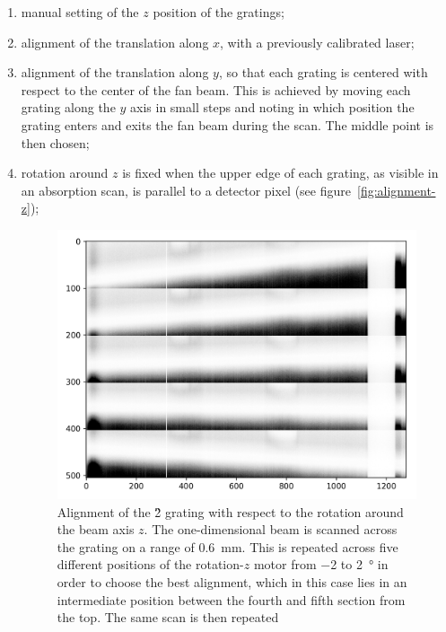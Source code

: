 \begin{enumerate}
    \item manual setting of the $z$ position of the gratings;
    \item alignment of the translation along $x$, with a previously
        calibrated laser;
    \item alignment of the translation along $y$,
        so that each grating is centered with respect to the center of the
        fan beam. This is achieved by moving each grating along the $y$ axis
        in small steps and noting in which position the grating enters and
        exits the fan beam during the scan. The middle point is then
        chosen;
    \item rotation around $z$ is fixed when the upper edge of each grating,
        as visible in an absorption scan, is parallel to a detector
        pixel (see figure~\ref{fig:alignment-z});
        \begin{figure}[htb]
            \centering
            \includegraphics[width=\textwidth]{gfx/alignment-rot-z.png}
            \caption[Alignment of \G2 around the $z$ rotation axis.]{Alignment of the \G2 grating with respect to the rotation
                around
            the beam axis $z$. The one-dimensional beam is scanned across the
            grating on a range of \SI{0.6}{\milli\metre}. This is repeated across
            five different positions of the rotation-$z$ motor from \num{-2} to
            \SI{+2}{\degree} in order to choose the
            best alignment, which in this case lies in an intermediate position between
            the fourth and fifth section from the top. The same scan is then repeated
}
\end{figure}
\end{enumerate}
